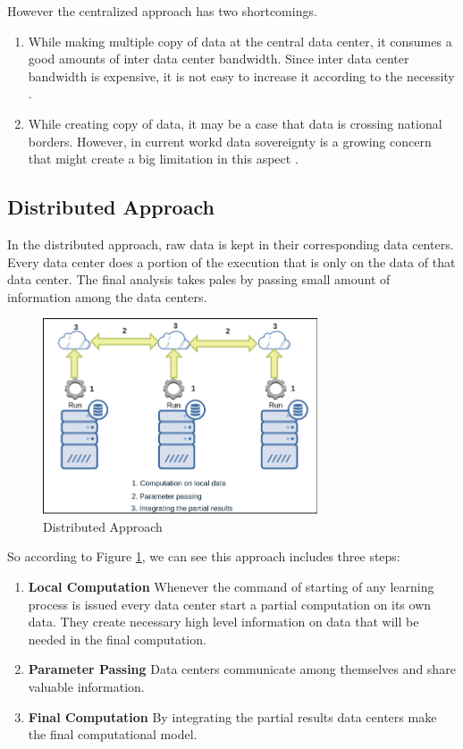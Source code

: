 \documentclass[10pt,conference,letterpaper]{IEEEtran}
\begin{document}
However the centralized approach has two shortcomings.
\begin{enumerate}
\item While making multiple copy of data at the central data center, it consumes a good amounts of inter data center bandwidth. Since inter data center bandwidth is expensive, it is not easy to increase it according to the necessity \cite{7,8,9,10}.
\item While creating copy of data, it may be a case that data is crossing national borders. However, in current workd data sovereignty is a growing concern that might create a big limitation in this aspect \cite{11,12}.

\end{enumerate}

\subsection{Distributed Approach}
In the distributed approach, raw data is kept in their corresponding data centers. Every data center does a portion of the execution that is only on the data of that data center. The final analysis takes pales by passing small amount of information among the data centers. 
\begin{center}
\begin{figure}[!htbp]
\includegraphics[width=3.2in]{2.png}
\caption{Distributed Approach}
\label{distributed}
\end{figure}
\end{center}

So according to Figure \ref{distributed}, we can see this approach includes three steps:

\begin{enumerate}
\item \textbf{Local Computation} Whenever the command of starting of any learning process is issued every data center start a partial computation on its own data. They create necessary high level information on data that will be needed in the final computation.

\item \textbf{Parameter Passing} Data centers communicate among themselves and share valuable information.

\item \textbf{Final Computation} By integrating the partial results data centers make the final computational model.
\end{enumerate}
\end{document}
